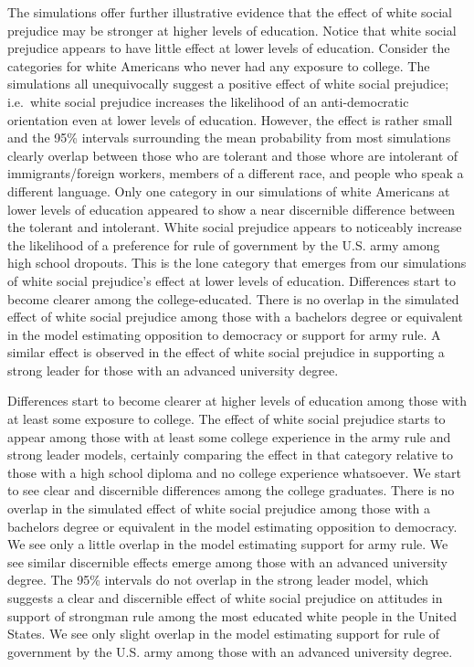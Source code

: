 \documentclass[11pt,]{article}
\begin{document}
The simulations offer further illustrative evidence that the effect of
white social prejudice may be stronger at higher levels of education.
Notice that white social prejudice appears to have little effect at
lower levels of education. Consider the categories for white Americans
who never had any exposure to college. The simulations all unequivocally
suggest a positive effect of white social prejudice; i.e.~white social
prejudice increases the likelihood of an anti-democratic orientation
even at lower levels of education. However, the effect is rather small
and the 95\% intervals surrounding the mean probability from most
simulations clearly overlap between those who are tolerant and those
whore are intolerant of immigrants/foreign workers, members of a
different race, and people who speak a different language. Only one
category in our simulations of white Americans at lower levels of
education appeared to show a near discernible difference between the
tolerant and intolerant. White social prejudice appears to noticeably
increase the likelihood of a preference for rule of government by the
U.S. army among high school dropouts. This is the lone category that
emerges from our simulations of white social prejudice's effect at lower
levels of education. Differences start to become clearer among the
college-educated. There is no overlap in the simulated effect of white
social prejudice among those with a bachelors degree or equivalent in
the model estimating opposition to democracy or support for army rule. A
similar effect is observed in the effect of white social prejudice in
supporting a strong leader for those with an advanced university degree.

Differences start to become clearer at higher levels of education among
those with at least some exposure to college. The effect of white social
prejudice starts to appear among those with at least some college
experience in the army rule and strong leader models, certainly
comparing the effect in that category relative to those with a high
school diploma and no college experience whatsoever. We start to see
clear and discernible differences among the college graduates. There is
no overlap in the simulated effect of white social prejudice among those
with a bachelors degree or equivalent in the model estimating opposition
to democracy. We see only a little overlap in the model estimating
support for army rule. We see similar discernible effects emerge among
those with an advanced university degree. The 95\% intervals do not
overlap in the strong leader model, which suggests a clear and
discernible effect of white social prejudice on attitudes in support of
strongman rule among the most educated white people in the United
States. We see only slight overlap in the model estimating support for
rule of government by the U.S. army among those with an advanced
university degree.
\end{document}
